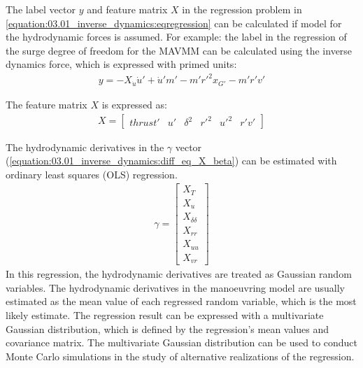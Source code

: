 \noindent The label vector \(y\) and feature matrix \(X\) in the regression problem in \autoref{equation:03.01_inverse_dynamics:eqregression} can be calculated if model for the hydrodynamic forces is assumed. For example: the label in the regression of the surge degree of freedom for the MAVMM can be calculated using the inverse dynamics force, which is expressed with primed units:
\begin{equation}\label{equation:03.01_inverse_dynamics:diff_eq_X_y}
\begin{split}\displaystyle y = - X_{\dot{u}} \dot{u}' + \dot{u}' m' - m' r'^{2} x_{G'} - m' r' v'\end{split}
\end{equation}

\noindent The feature matrix \(X\) is expressed as:
\begin{equation}\label{equation:03.01_inverse_dynamics:diff_eq_X_X}
\begin{split}\displaystyle X = \left[\begin{matrix}thrust' & u' & \delta^{2} & r'^{2} & u'^{2} & r' v'\end{matrix}\right]\end{split}
\end{equation}

\noindent The hydrodynamic derivatives in the \(\gamma\) vector (\autoref{equation:03.01_inverse_dynamics:diff_eq_X_beta}) can be estimated with ordinary least squares (OLS) regression.
\begin{equation}\label{equation:03.01_inverse_dynamics:diff_eq_X_beta}
\begin{split}\displaystyle \gamma = \left[\begin{matrix}X_{T}\\X_{u}\\X_{\delta\delta}\\X_{rr}\\X_{uu}\\X_{vr}\end{matrix}\right]\end{split}
\end{equation}
In this regression, the hydrodynamic derivatives are treated as Gaussian random variables. The hydrodynamic derivatives in the manoeuvring model are usually estimated as the mean value of each regressed random variable, which is the most likely estimate. The regression result can be expressed with a multivariate Gaussian distribution, which is defined by the regression’s mean values and covariance matrix. The multivariate Gaussian distribution can be used to conduct Monte Carlo simulations in the study of alternative realizations of the regression.


